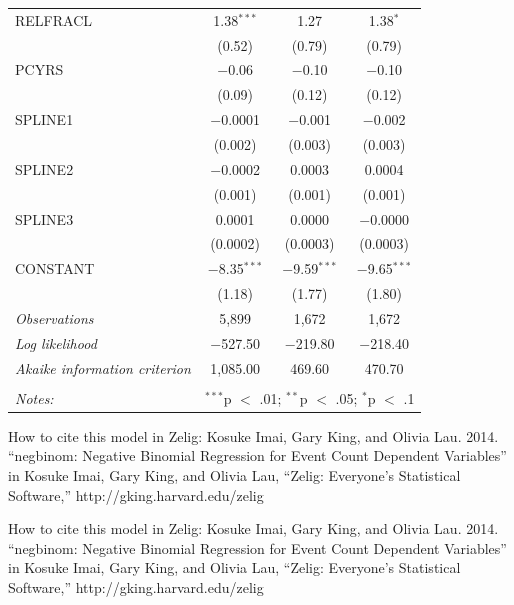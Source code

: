 \documentclass[11pt,article,oneside]{memoir}
\begin{document}
\begin{table}[!htbp]
\begin{tabular}{@{\extracolsep{5pt}}lccc}
  RELFRACL & 1.38$^{***}$ & 1.27 & 1.38$^{*}$ \\ 
  & (0.52) & (0.79) & (0.79) \\ 
  PCYRS & $-$0.06 & $-$0.10 & $-$0.10 \\ 
  & (0.09) & (0.12) & (0.12) \\ 
  SPLINE1 & $-$0.0001 & $-$0.001 & $-$0.002 \\ 
  & (0.002) & (0.003) & (0.003) \\ 
  SPLINE2 & $-$0.0002 & 0.0003 & 0.0004 \\ 
  & (0.001) & (0.001) & (0.001) \\ 
  SPLINE3 & 0.0001 & 0.0000 & $-$0.0000 \\ 
  & (0.0002) & (0.0003) & (0.0003) \\ 
  CONSTANT & $-$8.35$^{***}$ & $-$9.59$^{***}$ & $-$9.65$^{***}$ \\ 
  & (1.18) & (1.77) & (1.80) \\ 
 \textit{Observations} & 5,899 & 1,672 & 1,672 \\ 
\textit{Log likelihood} & $-$527.50 & $-$219.80 & $-$218.40 \\ 
\textit{Akaike information criterion} & 1,085.00 & 469.60 & 470.70 \\ 
\hline \\[-1.8ex] 
\textit{Notes:} & \multicolumn{3}{l}{$^{***}$p $<$ .01; $^{**}$p $<$ .05; $^{*}$p $<$ .1} \\ 
\end{tabular} 
\end{table}

How to cite this model in Zelig: Kosuke Imai, Gary King, and Olivia Lau.
2014. ``negbinom: Negative Binomial Regression for Event Count Dependent
Variables'' in Kosuke Imai, Gary King, and Olivia Lau, ``Zelig:
Everyone's Statistical Software,'' http://gking.harvard.edu/zelig

How to cite this model in Zelig: Kosuke Imai, Gary King, and Olivia Lau.
2014. ``negbinom: Negative Binomial Regression for Event Count Dependent
Variables'' in Kosuke Imai, Gary King, and Olivia Lau, ``Zelig:
Everyone's Statistical Software,'' http://gking.harvard.edu/zelig
\end{document}
